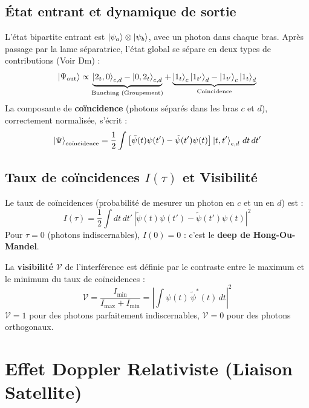 \documentclass[11pt,a4paper]{article}
\begin{document}
\subsection{État entrant et dynamique de sortie}
L'état bipartite entrant est $\ket{\psi_a}\otimes\ket{\psi_b}$, avec un photon
dans chaque bras. Après passage par la lame séparatrice, l'état global se sépare
en deux types de contributions (Voir Dm) :
\begin{equation}
    \ket{\Psi_{\rm out}} \propto
    \underbrace{\ket{2_t,0}_{c,d} - \ket{0,2_t}_{c,d}}_{\text{Bunching (Groupement)}}
    + \underbrace{\ket{1_t}_c \ket{1_{t'}}_d - \ket{1_{t'}}_c \ket{1_t}_d}_{\text{Coïncidence}}
\end{equation}
La composante de \textbf{coïncidence} (photons séparés dans les bras $c$ et $d$),
correctement normalisée, s'écrit :
\begin{equation}
    \ket{\Psi}_{\text{coïncidence}} = \frac{1}{2} \int \left[\tilde{\psi}(t)\psi(t') - \tilde{\psi}(t')\psi(t)\right] \ket{t,t'}_{c,d} \, dt \, dt'
\end{equation}

\subsection{Taux de coïncidences $I(\tau)$ et Visibilité}
Le taux de coïncidences (probabilité de mesurer un photon en $c$ et un en $d$) est :
\begin{equation}
    \boxed{ I(\tau) = \frac{1}{2} \int dt \, dt' \,
    \left|\tilde{\psi}(t)\psi(t') - \tilde{\psi}(t')\psi(t)\right|^2 }
\end{equation}
Pour $\tau = 0$ (photons indiscernables), $I(0) = 0$ : c'est le \textbf{deep de Hong-Ou-Mandel}.

La \textbf{visibilité} $\mathcal{V}$ de l'interférence est définie par le contraste entre
le maximum et le minimum du taux de coïncidences :
\begin{equation}
    \mathcal{V} = \frac{I_{\min}}{I_{\max} + I_{\min}}
    = \left|\int \psi(t)\,\tilde{\psi}^*(t) \, dt\right|^2
\end{equation}
$\mathcal{V} = 1$ pour des photons parfaitement indiscernables, $\mathcal{V} = 0$ pour
des photons orthogonaux.

\section{Effet Doppler Relativiste (Liaison Satellite)}
\end{document}
